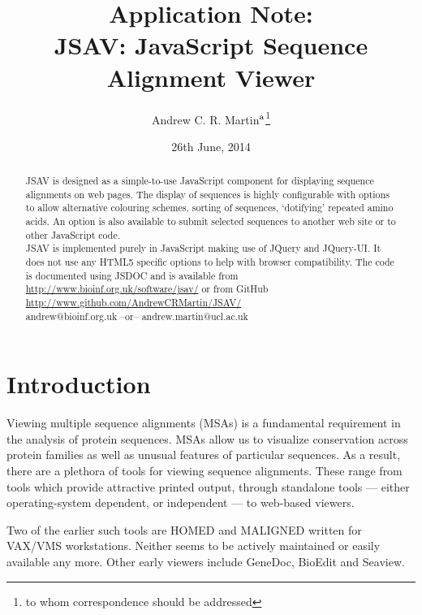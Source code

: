 \documentclass[a4]{bioinfo}
\title[JSAV: JavaScript Sequence Alignment Viewer]{Application Note:\\
JSAV: JavaScript Sequence Alignment Viewer}
\date{26th June, 2014}
\author[Martin]{Andrew C. R. Martin\mbox{${}^{\rm a}$}\footnote{to whom
    correspondence should be addressed}}
\begin{document}
\maketitle

\begin{abstract}
 JSAV is designed as a simple-to-use
JavaScript component for displaying sequence alignments on web pages.
The display of sequences is highly configurable with options to allow
alternative colouring schemes, sorting of sequences, `dotifying'
repeated amino acids. An option is also available to submit selected
sequences to another web site or to other JavaScript code.  \\
JSAV is implemented purely in JavaScript making use of JQuery and
JQuery-UI. It does not use any HTML5 specific options to help with
browser compatibility. The code is documented using JSDOC
and is available from \url{http://www.bioinf.org.uk/software/jsav/} or
from GitHub \url{http://www.github.com/AndrewCRMartin/JSAV/}\\
 andrew@bioinf.org.uk --or--
andrew.martin@ucl.ac.uk
\end{abstract}


\section{Introduction}
Viewing multiple sequence alignments (MSAs) is a fundamental
requirement in the analysis of protein sequences. MSAs allow us to
visualize conservation across protein families as well as unusual
features of particular sequences. As a result, there are a plethora of
tools for viewing sequence alignments. These range from tools which
provide attractive printed output, through standalone tools --- either
operating-system dependent, or independent --- to web-based viewers.

Two of the earlier such tools are HOMED\cite{stockwell:homed} and
MALIGNED\cite{clark:maligned} written for VAX/VMS workstations.
Neither seems to be actively maintained or easily available any
more. Other early viewers include GeneDoc\cite{nicholas:genedoc},
BioEdit and Seaview\cite{galtier:seaview}.
\end{document}

